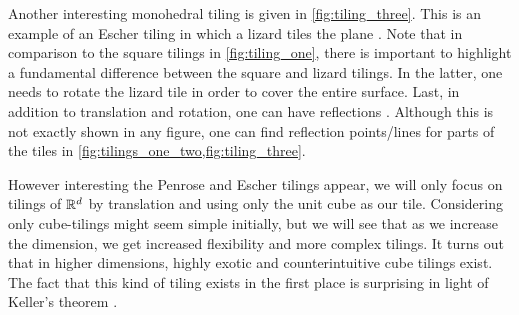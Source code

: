 \documentclass[../thesis.tex]{subfiles}
\begin{document}
Another interesting monohedral tiling is given in \cref{fig:tiling_three}. This is an example of an Escher tiling in which a lizard tiles the plane \cite{kolountzakisTilingsTranslation2010}. Note that in comparison to the square tilings in \cref{fig:tiling_one}, there is important to highlight a fundamental difference between the square and lizard tilings. In the latter, one needs to rotate the lizard tile in order to cover the entire surface. 
Last, in addition to translation and rotation, one can have reflections \cite{grunbaumTilingsPatterns1987}. Although this is not exactly shown in any figure, one can find reflection points/lines for parts of the tiles in \cref{fig:tilings_one_two,fig:tiling_three}. 



However interesting the Penrose and Escher tilings appear, we will only focus on tilings of $\mathbb{R}^d$ by translation and using only the unit cube as our tile. Considering only cube-tilings might seem simple initially, but we will see that as we increase the dimension, we get increased flexibility and more complex tilings. It turns out that in higher dimensions, highly exotic and counterintuitive cube tilings exist. The fact that this kind of tiling exists in the first place is surprising in light of Keller's theorem \cite{iosevichSpectralTilingProperties1998}.  %
\end{document}
